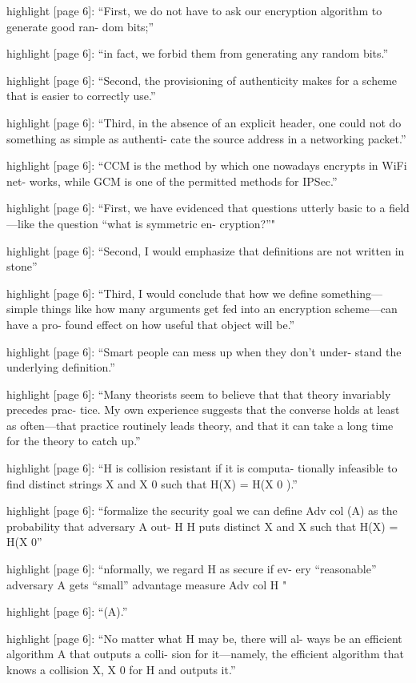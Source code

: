 highlight {[}page 6{]}: ``First, we do not have to ask our encryption
algorithm to generate good ran- dom bits;''

highlight {[}page 6{]}: ``in fact, we forbid them from generating any
random bits.''

highlight {[}page 6{]}: ``Second, the provisioning of authenticity makes
for a scheme that is easier to correctly use.''

highlight {[}page 6{]}: ``Third, in the absence of an explicit header,
one could not do something as simple as authenti- cate the source
address in a networking packet.''

highlight {[}page 6{]}: ``CCM is the method by which one nowadays
encrypts in WiFi net- works, while GCM is one of the permitted methods
for IPSec.''

highlight {[}page 6{]}: ``First, we have evidenced that questions
utterly basic to a field---like the question ``what is symmetric en-
cryption?''"

highlight {[}page 6{]}: ``Second, I would emphasize that definitions are
not written in stone''

highlight {[}page 6{]}: ``Third, I would conclude that how we define
something---simple things like how many arguments get fed into an
encryption scheme---can have a pro- found effect on how useful that
object will be.''

highlight {[}page 6{]}: ``Smart people can mess up when they don't
under- stand the underlying definition.''

highlight {[}page 6{]}: ``Many theorists seem to believe that that
theory invariably precedes prac- tice. My own experience suggests that
the converse holds at least as often---that practice routinely leads
theory, and that it can take a long time for the theory to catch up.''

highlight {[}page 6{]}: ``H is collision resistant if it is computa-
tionally infeasible to find distinct strings X and X 0 such that H(X) =
H(X 0 ).''

highlight {[}page 6{]}: ``formalize the security goal we can define Adv
col (A) as the probability that adversary A out- H H puts distinct X and
X such that H(X) = H(X 0''

highlight {[}page 6{]}: ``nformally, we regard H as secure if ev- ery
``reasonable'' adversary A gets ``small'' advantage measure Adv col H "

highlight {[}page 6{]}: ``(A).''

highlight {[}page 6{]}: ``No matter what H may be, there will al- ways
be an efficient algorithm A that outputs a colli- sion for it---namely,
the efficient algorithm that knows a collision X, X 0 for H and outputs
it.''

